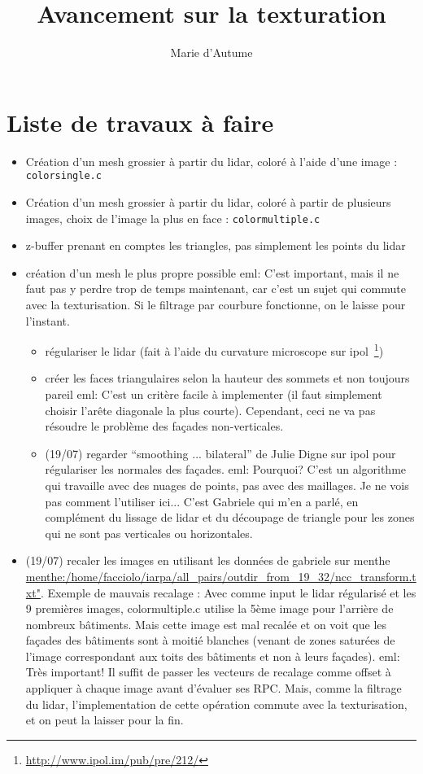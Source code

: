\documentclass{article}
\title{Avancement sur la texturation}
\author{Marie d'Autume}
\newcommand{\mnhrdt}[1]{{\footnotesize\textcolor[rgb]{0.8,0.5,0.5}{eml: #1}}}
\begin{document}
\maketitle

\section{Liste de travaux à faire}
\label{sec:todolist}

\begin{itemize}
\item[\checkmark] Création d'un mesh grossier à partir du lidar, coloré à l'aide d'une image : \verb"colorsingle.c"
\item[\checkmark] Création d'un mesh grossier à partir du lidar, coloré à partir de plusieurs images, choix de l'image la plus en face : \verb"colormultiple.c"
\item z-buffer prenant en comptes les triangles, pas simplement les points du lidar
\item création d'un mesh le plus propre possible
	\mnhrdt{C'est important, mais il ne faut pas y perdre trop de temps
		maintenant, car c'est un sujet qui commute avec la
		texturisation.  Si le filtrage par courbure fonctionne, on le
		laisse pour l'instant.}
\begin{itemize}
\item[\checkmark] régulariser le lidar (fait à l'aide du curvature microscope
sur ipol~\footnote{\url{http://www.ipol.im/pub/pre/212/}})
\item[\checkmark]  créer les faces triangulaires selon la hauteur des sommets et
	non toujours pareil
		\mnhrdt{C'est un critère facile à implementer (il faut
		simplement choisir l'arête diagonale la plus courte).
		Cependant, ceci ne va pas résoudre le problème des façades
		non-verticales.}
\item (19/07) regarder ``smoothing ... bilateral'' de Julie Digne sur ipol pour
régulariser les normales des façades.
		\mnhrdt{Pourquoi? C'est un algorithme qui travaille avec des
		nuages de points, pas avec des maillages.  Je ne vois pas
		comment l'utiliser ici...} C'est Gabriele qui m'en a parl\'e, en compl\'ement du lissage de lidar et du d\'ecoupage de triangle pour les zones qui ne sont pas verticales ou horizontales.
\end{itemize}
\item (19/07) recaler les images en utilisant les données de gabriele sur menthe \url{menthe:/home/facciolo/iarpa/all_pairs/outdir_from_19_32/ncc_transform.txt"}. Exemple de mauvais recalage : Avec comme input le lidar r\'egularis\'e et les 9 premi\`eres images, colormultiple.c utilise la 5\`eme image pour l'arri\`ere de nombreux b\^atiments. Mais cette image est mal recal\'ee et on voit que les fa\c cades des b\^atiments sont \`a moiti\'e blanches (venant de zones satur\'ees de l'image correspondant aux toits des b\^atiments et non \`a leurs fa\c cades).
	\mnhrdt{Très important!  Il suffit de passer les vecteurs de recalage
		comme offset à appliquer à chaque image avant d'évaluer ses
		RPC.  Mais, comme la filtrage du lidar, l'implementation de
		cette opération commute avec la texturisation, et on peut la
		laisser pour la fin.}
		

\end{itemize}
\end{document}
